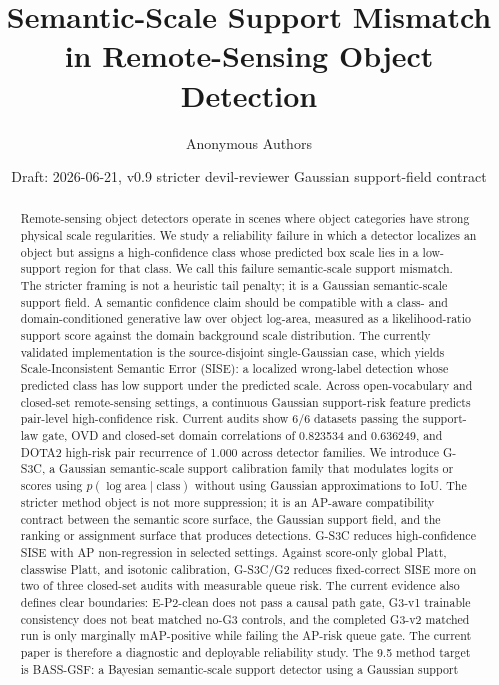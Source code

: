 \documentclass[10pt]{article}
\title{Semantic-Scale Support Mismatch in Remote-Sensing Object Detection}
\author{Anonymous Authors}
\date{Draft: 2026-06-21, v0.9 stricter devil-reviewer Gaussian support-field contract}
\newcommand{\logarea}{\log \mathrm{area}}
\begin{document}
\maketitle

\begin{abstract}
Remote-sensing object detectors operate in scenes where object categories have
strong physical scale regularities.  We study a reliability failure in which a
detector localizes an object but assigns a high-confidence class whose predicted
box scale lies in a low-support region for that class.  We call this failure
semantic-scale support mismatch.  The stricter framing is not a heuristic tail
penalty; it is a Gaussian semantic-scale support field.  A semantic confidence
claim should be compatible with a class- and domain-conditioned generative law
over object log-area, measured as a likelihood-ratio support score against the
domain background scale distribution.  The currently validated implementation
is the source-disjoint single-Gaussian case, which yields Scale-Inconsistent
Semantic Error (SISE): a localized wrong-label detection whose predicted class
has low support under the predicted scale.
Across open-vocabulary and closed-set remote-sensing settings, a continuous
Gaussian support-risk feature predicts pair-level high-confidence risk.
Current audits
show 6/6 datasets passing the support-law gate, OVD and closed-set domain
correlations of 0.823534 and 0.636249, and DOTA2 high-risk pair recurrence of
1.000 across detector families.  We introduce G-S3C, a Gaussian semantic-scale
support calibration family that modulates logits or scores using
$p(\logarea\mid \mathrm{class})$ without using Gaussian approximations to IoU.
The stricter method object is not more suppression; it is an AP-aware
compatibility contract between the semantic score surface, the Gaussian support
field, and the ranking or assignment surface that produces detections.  G-S3C
reduces high-confidence SISE with AP non-regression in selected settings.
Against score-only global Platt, classwise Platt, and isotonic calibration,
G-S3C/G2 reduces fixed-correct SISE more on two of three closed-set audits with
measurable queue risk.
The current evidence also defines clear boundaries: E-P2-clean does not pass a
causal path gate, G3-v1 trainable consistency does not beat matched no-G3
controls, and the completed G3-v2 matched run is only marginally mAP-positive
while failing the AP-risk queue gate.  The current paper is therefore a
diagnostic and deployable reliability study.  The 9.5 method target is
BASS-GSF: a Bayesian semantic-scale support detector using a Gaussian support

\end{abstract}
\end{document}
